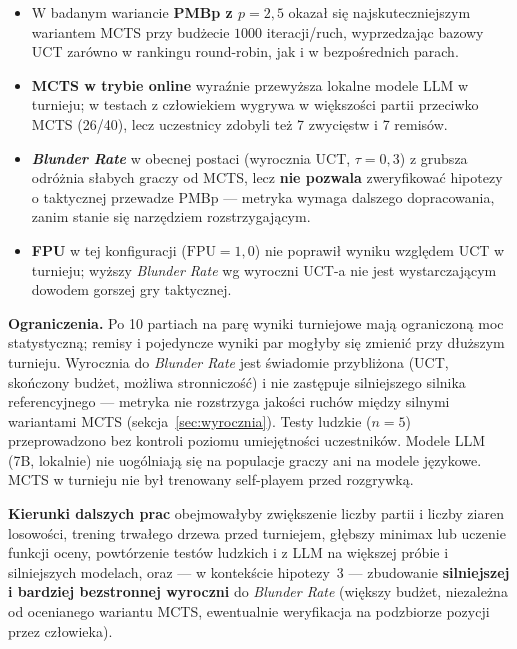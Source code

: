 \documentclass[11pt, a4paper]{article}
\begin{document}
\begin{itemize}
    \item W badanym wariancie \textbf{PMBp z $p = 2{,}5$} okazał się najskuteczniejszym wariantem MCTS przy budżecie $1000$ iteracji/ruch, wyprzedzając bazowy UCT zarówno w rankingu round-robin, jak i w bezpośrednich parach.
    \item \textbf{MCTS w trybie online} wyraźnie przewyższa lokalne modele LLM w turnieju; w testach z człowiekiem wygrywa w większości partii przeciwko MCTS (26/40), lecz uczestnicy zdobyli też 7 zwycięstw i 7 remisów.
    \item \textbf{\textit{Blunder Rate}} w obecnej postaci (wyrocznia UCT, $\tau = 0{,}3$) z grubsza odróżnia słabych graczy od MCTS, lecz \textbf{nie pozwala} zweryfikować hipotezy o taktycznej przewadze PMBp --- metryka wymaga dalszego dopracowania, zanim stanie się narzędziem rozstrzygającym.
    \item \textbf{FPU} w tej konfiguracji ($\mathrm{FPU} = 1{,}0$) nie poprawił wyniku względem UCT w turnieju; wyższy \textit{Blunder Rate} wg wyroczni UCT-a nie jest wystarczającym dowodem gorszej gry taktycznej.
\end{itemize}

\textbf{Ograniczenia.} Po 10 partiach na parę wyniki turniejowe mają ograniczoną moc statystyczną; remisy i pojedyncze wyniki par mogłyby się zmienić przy dłuższym turnieju. Wyrocznia do \textit{Blunder Rate} jest świadomie przybliżona (UCT, skończony budżet, możliwa stronniczość) i nie zastępuje silniejszego silnika referencyjnego --- metryka nie rozstrzyga jakości ruchów między silnymi wariantami MCTS (sekcja~\ref{sec:wyrocznia}). Testy ludzkie ($n = 5$) przeprowadzono bez kontroli poziomu umiejętności uczestników. Modele LLM (7B, lokalnie) nie uogólniają się na populacje graczy ani na modele językowe. MCTS w turnieju nie był trenowany self-playem przed rozgrywką.

\textbf{Kierunki dalszych prac} obejmowałyby zwiększenie liczby partii i liczby ziaren losowości, trening trwałego drzewa przed turniejem, głębszy minimax lub uczenie funkcji oceny, powtórzenie testów ludzkich i z LLM na większej próbie i silniejszych modelach, oraz --- w kontekście hipotezy~3 --- zbudowanie \textbf{silniejszej i bardziej bezstronnej wyroczni} do \textit{Blunder Rate} (większy budżet, niezależna od ocenianego wariantu MCTS, ewentualnie weryfikacja na podzbiorze pozycji przez człowieka).

\end{document}
